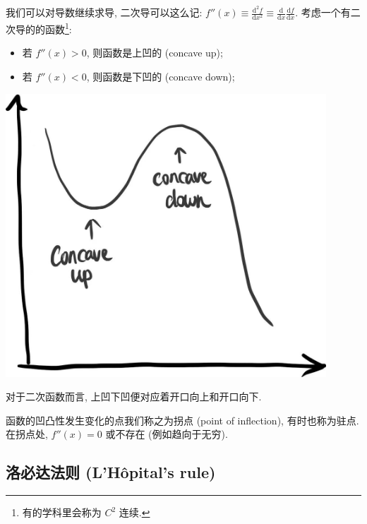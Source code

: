 \begin{tcolorbox}[size=fbox, breakable, enhanced jigsaw, title={二次导和凹凸性}]

我们可以对导数继续求导, 二次导可以这么记: $f''(x)\equiv \frac{\mathrm{d}^2f}{\mathrm{d}x^2}\equiv \frac{\mathrm{d}}{\mathrm{d}x}\frac{\mathrm{d}f}{\mathrm{d}x}$. 考虑一个有二次导的的函数\footnote{有的学科里会称为 $C^2$ 连续.}:

\begin{itemize}

\item
  若 $f''(x)>0$, 则函数是上凹的 (concave up);
\item
  若 $f''(x)<0$, 则函数是下凹的 (concave down);
\end{itemize}

\begin{tcolorbox}[size=fbox, breakable, enhanced jigsaw, sidebyside]
\includegraphics[width=0.9\textwidth]{img/image-20230614143547029.png}
\tcblower
\kaishu{\small }
\end{tcolorbox}

对于二次函数而言, 上凹下凹便对应着开口向上和开口向下.

函数的凹凸性发生变化的点我们称之为拐点 (point of inflection),
有时也称为驻点. 在拐点处, $f''(x)=0$ 或不存在 (例如趋向于无穷).

\end{tcolorbox}

\subsection{洛必达法则 (L'Hôpital's
rule)}

